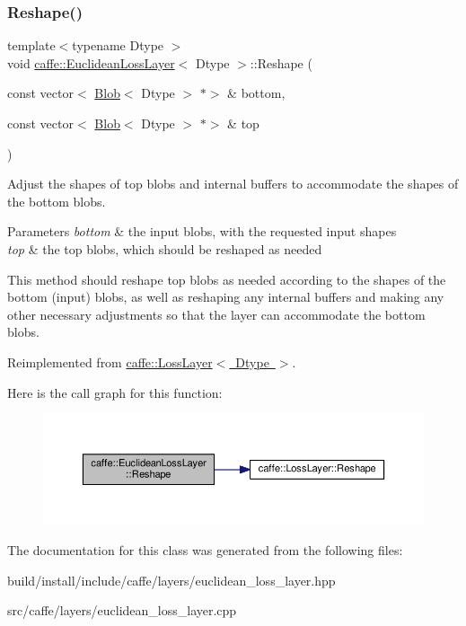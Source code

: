 \subsubsection{\texorpdfstring{Reshape()}{Reshape()}\hspace{0.1cm}{\footnotesize\ttfamily [2/2]}}
{\footnotesize\ttfamily template$<$typename Dtype $>$ \\
void \mbox{\hyperlink{classcaffe_1_1_euclidean_loss_layer}{caffe\+::\+Euclidean\+Loss\+Layer}}$<$ Dtype $>$\+::Reshape (\begin{DoxyParamCaption}\item[{const vector$<$ \mbox{\hyperlink{classcaffe_1_1_blob}{Blob}}$<$ Dtype $>$ $\ast$$>$ \&}]{bottom,  }\item[{const vector$<$ \mbox{\hyperlink{classcaffe_1_1_blob}{Blob}}$<$ Dtype $>$ $\ast$$>$ \&}]{top }\end{DoxyParamCaption})\hspace{0.3cm}{\ttfamily [virtual]}}



Adjust the shapes of top blobs and internal buffers to accommodate the shapes of the bottom blobs. 


\begin{DoxyParams}{Parameters}
{\em bottom} & the input blobs, with the requested input shapes \\
\hline
{\em top} & the top blobs, which should be reshaped as needed\\
\hline
\end{DoxyParams}
This method should reshape top blobs as needed according to the shapes of the bottom (input) blobs, as well as reshaping any internal buffers and making any other necessary adjustments so that the layer can accommodate the bottom blobs. 

Reimplemented from \mbox{\hyperlink{classcaffe_1_1_loss_layer_abf00412194f5413ea9468ee44b0d986f}{caffe\+::\+Loss\+Layer$<$ Dtype $>$}}.

Here is the call graph for this function\+:
\nopagebreak
\begin{figure}[H]
\begin{center}
\leavevmode
\includegraphics[width=350pt]{classcaffe_1_1_euclidean_loss_layer_a9cbe90ea0130c31bd5b9419a1bbaa555_cgraph}
\end{center}
\end{figure}


The documentation for this class was generated from the following files\+:\begin{DoxyCompactItemize}
\item 
build/install/include/caffe/layers/euclidean\+\_\+loss\+\_\+layer.\+hpp\item 
src/caffe/layers/euclidean\+\_\+loss\+\_\+layer.\+cpp\end{DoxyCompactItemize}
